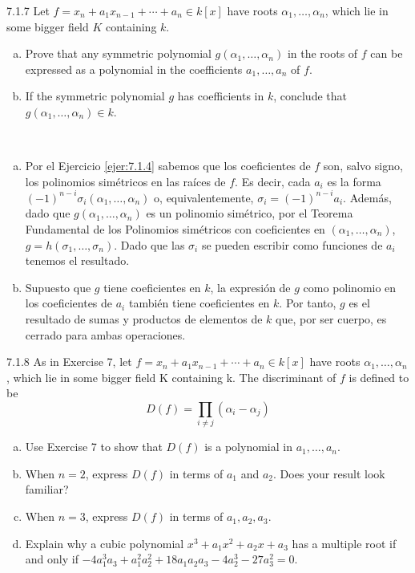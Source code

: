 \documentclass[twoside]{article}
\begin{document}
\begin{ejercicio}{7.1.7}
Let $f = x_n + a_1x_{n−1} + \cdots + a_n ∈ k[x]$ have roots $α_1,\dots, α_n$, which lie in some bigger
field $K$ containing $k$.
\begin{enumerate}[a.]
\item Prove that any symmetric polynomial $g(α_1, \dots , α_n)$ in the roots of $f$ can be expressed
as a polynomial in the coefficients $a_1, \dots , a_n$ of $f$.
\item If the symmetric polynomial $g$ has coefficients in $k$, conclude that
$g(α_1, \dots , α_n) ∈ k$.
\end{enumerate}
 
\end{ejercicio}
\begin{solucion}\
\begin{enumerate}[a.]
\item Por el Ejercicio \ref{ejer:7.1.4} sabemos que los coeficientes de $f$ son, salvo signo, los polinomios simétricos en las raíces de $f$. Es decir, cada $a_i$ es la forma $(-1)^{n-i}\sigma_i(\alpha_1,\dotsc,\alpha_n)$ o, equivalentemente, $\sigma_i = (-1)^{n-i}a_i$. Además, dado que $g(\alpha_1,\dotsc,\alpha_n)$ es un polinomio simétrico, por el Teorema Fundamental de los Polinomios simétricos con coeficientes en $(\alpha_1,\dotsc,\alpha_n)$, $g=h(\sigma_1,\dotsc,\sigma_n)$. Dado que las $\sigma_i$ se pueden escribir como funciones de $a_i$ tenemos el resultado.
\item Supuesto que $g$ tiene coeficientes en $k$, la expresión de $g$ como polinomio en los coeficientes de $a_i$ también tiene coeficientes en $k$. Por tanto, $g$ es el resultado de sumas y productos de elementos de $k$ que, por ser cuerpo, es cerrado para ambas operaciones.
\end{enumerate}

\end{solucion}

\newpage




\begin{ejercicio}{7.1.8}
As in Exercise 7, let $f = x_n +a_1x_{n−1} +\cdots + a_n ∈ k[x]$ have roots $α_1, \dotsc , α_n$, which lie
in some bigger field K containing k. The discriminant of $f$ is defined to be
$$
D( f) = \prod_{i\neq j}(\alpha_i - \alpha_j)
$$
\begin{enumerate}[a.]
\item Use Exercise 7 to show that $D( f )$ is a polynomial in $a_1, \dotsc, a_n$.
\item When $n = 2$, express $D( f )$ in terms of $a_1$ and $a_2$. Does your result look familiar?
\item  When $n = 3$, express $D( f )$ in terms of $a_1, a_2, a_3$.
\item Explain why a cubic polynomial $x^3 +a_1x^2 +a_2x+a_3$ has a multiple root if and only if $−4a^3_1a_3 + a^2_1a^2_2+ 18a_1a_2a_3 - 4a^3_2 - 27a^2_3= 0.$
\end{enumerate}
\end{ejercicio}
\end{document}
